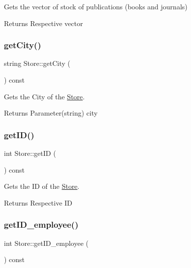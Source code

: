 Gets the vector of stock of publications (books and journals) 

\begin{DoxyReturn}{Returns}
Respective vector 
\end{DoxyReturn}
\mbox{\label{class_store_a63032ec1afe4b301f55584a8018f478c}} 
\subsubsection{\texorpdfstring{get\+City()}{getCity()}}
{\footnotesize\ttfamily string Store\+::get\+City (\begin{DoxyParamCaption}{ }\end{DoxyParamCaption}) const}



Gets the City of the \hyperlink{class_store}{Store}. 

\begin{DoxyReturn}{Returns}
Parameter(string) city 
\end{DoxyReturn}
\mbox{\label{class_store_aaaf0609bbd37babf36a4b9afb09709cf}} 
\subsubsection{\texorpdfstring{get\+I\+D()}{getID()}}
{\footnotesize\ttfamily int Store\+::get\+ID (\begin{DoxyParamCaption}{ }\end{DoxyParamCaption}) const}



Gets the ID of the \hyperlink{class_store}{Store}. 

\begin{DoxyReturn}{Returns}
Respective ID 
\end{DoxyReturn}
\mbox{\label{class_store_a6b828ab56ffdcf4c8eb64e53ab998543}} 
\subsubsection{\texorpdfstring{get\+I\+D\+\_\+employee()}{getID\_employee()}}
{\footnotesize\ttfamily int Store\+::get\+I\+D\+\_\+employee (\begin{DoxyParamCaption}{ }\end{DoxyParamCaption}) const}



